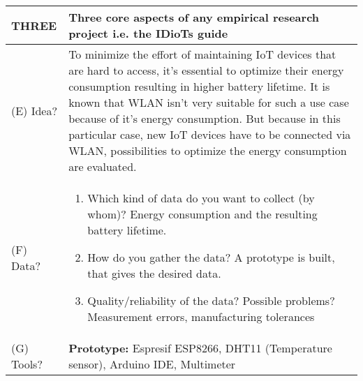 \documentclass[10pt,table]{article}
\providecommand{\gercom}[1]{\glqq{}#1\grqq{}}
\providecommand{\lgc}{\cellcolor{lightgray}}
\begin{document}
\begin{center}
\begin{longtable}{p{4.5cm}p{4cm}p{2.5cm}p{4cm}p{2.5cm}p{3.5cm}}
		\midrule
		\lgc THREE                       & \multicolumn{5}{p{18cm}}{\lgc Three core aspects of any empirical research project i.e. the \gercom{IDioTs} guide}                                                                                                                                                                                                                                                                                                                                                                                                              \\
		\midrule
		\lgc  (E) Idea?                  & \multicolumn{5}{p{18cm}}{To minimize the effort of maintaining IoT devices that are hard to access, it's essential to optimize their energy consumption resulting in higher battery lifetime. It is known that WLAN isn't very suitable for such a use case because of it's energy consumption. But because in this particular case, new IoT devices have to be connected via WLAN, possibilities to optimize the energy consumption are evaluated.}                                                                            \\[1ex]
		\lgc  (F) Data?                  & \multicolumn{5}{p{18cm}}{
		\begin{enumerate}
				\setlength\itemsep{.1ex}
				\item Which kind of data do you want to collect (by whom)?
				      \subitem Energy consumption and the resulting battery lifetime.
				\item How do you gather the data?
				      \subitem A prototype is built, that gives the desired data.
				\item Quality/reliability of the data? Possible problems?
				      \subitem Measurement errors, manufacturing tolerances
			\end{enumerate}}                                                                                                                                                                                                                                                                                                                                                                                                                                                                                                     \\[1ex]
		\lgc (G) Tools?                  & \multicolumn{5}{p{18cm}}{\textbf{Prototype:} Espresif ESP8266, DHT11 (Temperature sensor), Arduino IDE, Multimeter }                                                                                                                                                                                                                                                                                                                                                                                                            \\[1ex]

\end{longtable}
\end{center}
\end{document}
